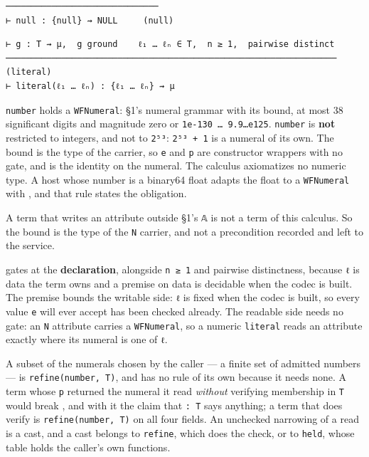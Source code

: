 \begin{definition}[(null)]
\label{rule:null}
\leanok
\begin{verbatim}
──────────────────────────────
⊢ null : {null} ⇝ NULL     (null)
\end{verbatim}
\end{definition}

\begin{definition}[(literal)]
\label{rule:literal}
\leanok
\begin{verbatim}
⊢ g : T ⇝ μ,  g ground    ℓ₁ … ℓₙ ∈ T,  n ≥ 1,  pairwise distinct
───────────────────────────────────────────────────────────────── (literal)
⊢ literal(ℓ₁ … ℓₙ) : {ℓ₁ … ℓₙ} ⇝ μ
\end{verbatim}
\end{definition}

\texttt{number} holds a \texttt{WFNumeral}: §1's numeral grammar with its bound, at most 38 significant
digits and magnitude zero or \texttt{1e-130\ …\ 9.9…e125}. \texttt{number} is \textbf{not} restricted to integers,
and not to \texttt{2⁵³}: \texttt{2⁵³\ +\ 1} is a numeral of its own. The bound is the type of the carrier, so
\texttt{e} and \texttt{p} are constructor wrappers with no gate, and  is the identity on the
numeral. The calculus axiomatizes no numeric type. A host whose number is a binary64 float adapts the
float to a \texttt{WFNumeral} with , and that rule states the obligation.

A term that writes an attribute outside §1's \texttt{𝔸} is not a term of this calculus. So the bound is the
type of the \texttt{N} carrier, and not a precondition recorded and left to the service.

 gates at the \textbf{declaration}, alongside \texttt{n\ ≥\ 1} and pairwise
distinctness, because \texttt{ℓ} is data the term owns and a premise on data is decidable when the codec is
built. The premise bounds the writable side: \texttt{ℓ} is fixed when the codec is built, so every value
\texttt{e} will ever accept has been checked already. The readable side needs no gate: an \texttt{N} attribute
carries a \texttt{WFNumeral}, so a numeric \texttt{literal} reads an attribute exactly where its numeral is one of
\texttt{ℓ}.

A subset of the numerals chosen by the caller — a finite set of admitted numbers — is
\texttt{refine(number,\ T)}, and has no rule of its own because it needs none. A term whose \texttt{p} returned the
numeral it read \emph{without} verifying membership in \texttt{T} would break , and with it the
claim that \texttt{:\ T} says anything; a term that does verify is \texttt{refine(number,\ T)} on all four fields. An
unchecked narrowing of a read is a cast, and a cast belongs to \texttt{refine}, which does the check, or to
\texttt{held}, whose table holds the caller's own functions.


